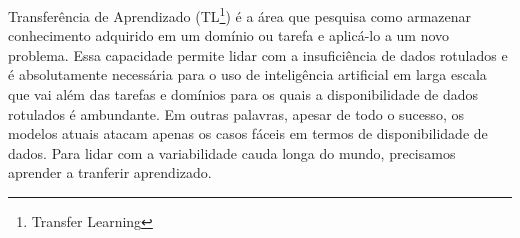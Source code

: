 \documentclass[
12pt, %
a4paper, %
onecolumn, %
]{article}
\begin{document}

Transferência de Aprendizado (TL\footnote{Transfer Learning}) é a área que pesquisa como armazenar conhecimento adquirido em um domínio ou tarefa e aplicá-lo a um novo problema. Essa capacidade permite lidar com a insuficiência de dados rotulados e é absolutamente necessária para o uso de inteligência artificial em larga escala que vai além das tarefas e domínios para os quais a disponibilidade de dados rotulados é ambundante. Em outras palavras, apesar de todo o sucesso, os modelos atuais atacam apenas os casos fáceis em termos de disponibilidade de dados. Para lidar com a variabilidade cauda longa do mundo, precisamos aprender a tranferir aprendizado.



\end{document}
